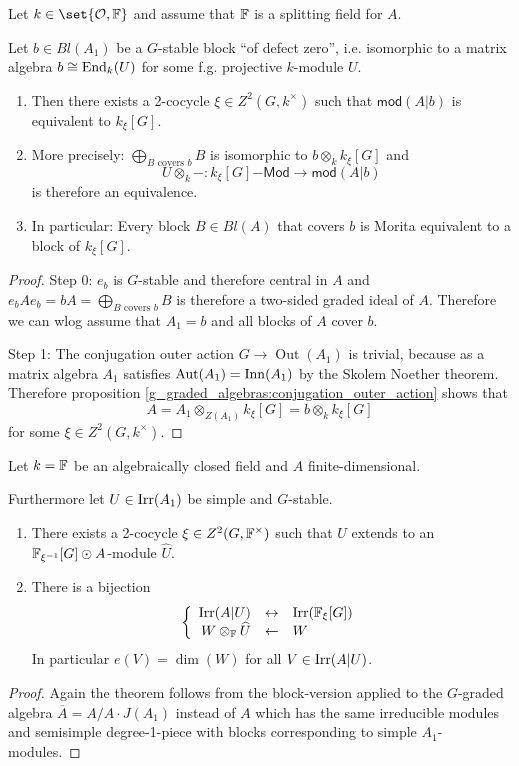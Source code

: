 
\begin{theorem}
Let $k\in\set{\mathcal{O},\IF}$ and assume that $\mathbb{F}$ is a splitting field for $A$.

Let $b\in Bl(A_1)$ be a $G$-stable block \enquote{of defect zero}, i.e. isomorphic to a matrix algebra $b\cong\operatorname{End}_k(U)$ for some f.g. projective $k$-module $U$. 
\begin{enumerate}
\item Then there exists a 2-cocycle $\xi\in Z^2(G,k^\times)$ such that $\mathsf{mod}(A|b)$ is equivalent to $k_\xi[G]$.
\item More precisely: $\bigoplus_{B \text{ covers }b} B$ is isomorphic to $b \otimes_k k_\xi[G]$ and
\[U\otimes_k - : k_\xi[G]\mathsf{-Mod} \to \mathsf{mod}(A|b)\]
is therefore an equivalence.
\item In particular: Every block $B\in Bl(A)$ that covers $b$ is Morita equivalent to a block of $k_\xi[G]$.
\end{enumerate}
\end{theorem}
\begin{proof}
Step 0: $e_b$ is $G$-stable and therefore central in $A$ and $e_b A e_b=bA=\bigoplus_{B\text{ covers }b} B$ is therefore a two-sided graded ideal of $A$. Therefore we can wlog assume that $A_1=b$ and all blocks of $A$ cover $b$.

\medbreak
Step 1: The conjugation outer action $G \to \operatorname{Out}(A_1)$ is trivial, because as a matrix algebra $A_1$ satisfies $\operatorname{Aut}(A_1) = \operatorname{Inn}(A_1)$ by the Skolem Noether theorem. Therefore proposition \ref{g_graded_algebras:conjugation_outer_action} shows that
\[A = A_1 \otimes_{Z(A_1)} k_\xi[G] = b \otimes_k k_\xi[G]\]
for some $\xi\in Z^2(G,k^\times)$.
\end{proof}

\begin{theorem}[Clifford]
Let $k=\mathbb{F}$ be an algebraically closed field and $A$ finite-dimensional.

Furthermore let $U\in\operatorname{Irr}(A_1)$ be simple and $G$-stable.

\begin{enumerate}
\item There exists a 2-cocycle $\xi\in Z^2(G,\mathbb{F}^\times)$ such that $U$ extends to an $\mathbb{F}_{\xi^{-1}}[G] \odot A$-module $\widehat{U}$.
\item There is a bijection
\[\left\lbrace\begin{array}{rcl}
\operatorname{Irr}(A|U) &\leftrightarrow& \operatorname{Irr}(\mathbb{F}_\xi[G]) \\
W\otimes_{\mathbb{F}} \widehat{U} &\leftarrow& W
\end{array}\right.\]
In particular $e(V) = \dim(W)$ for all $V\in\operatorname{Irr}(A|U)$.
\end{enumerate}
\end{theorem}
\begin{proof}
Again the theorem follows from the block-version applied to the $G$-graded algebra $\overline{A} = A/A\cdot J(A_1)$ instead of $A$ which has the same irreducible modules and semisimple degree-1-piece with blocks corresponding to simple $A_1$-modules.
\end{proof}